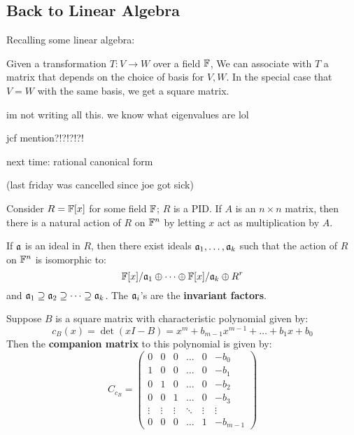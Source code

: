 \subsection{Back to Linear Algebra}
Recalling some linear algebra:

Given a transformation $ T: V \rightarrow W $ over a field $ \mathbb{F} $,
We can associate with $ T $ a matrix that depends on the choice of basis for
$ V, W $. In the special case that $ V = W $ with the same basis, we get a
square matrix.

im not writing all this. we know what eigenvalues are lol

jcf mention?!?!?!?!

next time: rational canonical form

(last friday was cancelled since joe got sick)

Consider $ R = \mathbb{F}[x] $ for some field $ \mathbb{F} $; $ R $ is a PID.
If $ A $ is an $ n\times n $ matrix, then there is a natural action of $ R $
on $ \mathbb{F}^{n} $ by letting $ x $ act as multiplication by $ A $.

If $ \mathfrak{a} $ is an ideal in $ R $, then there exist ideals
$ \mathfrak{a}_{1}, \dots, \mathfrak{a}_{k} $ such that the action of $ R $ on
$ \mathbb{F}^{n} $ is isomorphic to:
\begin{equation*}
    \mathbb{F}[x]/\mathfrak{a}_{1} \oplus \dots \oplus \mathbb{F}[x]/\mathfrak{a}_{k} \oplus R^{r}
\end{equation*}
and $ \mathfrak{a}_{1} \supseteq \mathfrak{a}_{2} \supseteq \dots \supseteq \mathfrak{a}_{k} $.
The $ \mathfrak{a}_{i} $'s are the \textbf{invariant factors}.

\begin{defn}
    Suppose $ B $ is a square matrix with characteristic polynomial given by:
    \begin{equation*}
        c_{B}(x) = \det(xI - B) = x^{m}+b_{m-1}x^{m-1}+\dots+b_{1}x+b_{0}
    \end{equation*}
    Then the \textbf{companion matrix} to this polynomial is given by:
    \begin{equation*}
        C_{c_{B}} = \begin{pmatrix}
            0 & 0 & 0 & \dots & 0 & -b_{0} \\
            1 & 0 & 0 & \dots & 0 & -b_{1} \\
            0 & 1 & 0 & \dots & 0 & -b_{2} \\
            0 & 0 & 1 & \dots & 0 & -b_{3} \\
            \vdots & \vdots & \vdots & \ddots & \vdots & \vdots \\
            0 & 0 & 0 & \dots & 1 & -b_{m-1}
        \end{pmatrix}
    \end{equation*}
\end{defn}

